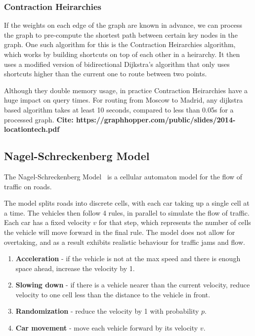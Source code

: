 \documentclass[ %
                    author={Alexander Hill},
                supervisor={Dr. Benjamin Sach},
                    degree={MEng},
                     title={MARMOSET: Multi Agent Real-time Multi-core Online
                     Simulation for Efficient Transportation},
                  subtitle={},
                      type={research},
                      year={2016} ]{dissertation}
\begin{document}
\subsubsection{Contraction Heirarchies}

If the weights on each edge of the graph are known in advance, we can process
the graph to pre-compute the shortest path between certain key nodes in the
graph. One such algorithm for this is the Contraction Heirarchies algorithm,
which works by building shortcuts on top of each other in a heirarchy. It then
uses a modified version of bidirectional Dijkstra's algorithm that only uses
shortcuts higher than the current one to route between two points.

Although they double memory usage, in practice Contraction Heirarchies have a
huge impact on query times. For routing from Moscow to Madrid, any dijkstra based algorithm
takes at least 10 seconds, compared to less than 0.05s for a processed graph.
\textbf{Cite: https://graphhopper.com/public/slides/2014-locationtech.pdf}

\subsection{Nagel-Schreckenberg Model} \label{sec:nagel}

The Nagel-Schreckenberg Model~\cite{nagel} is a cellular automaton model for the flow of
traffic on roads.

The model splits roads into discrete cells, with each car taking up a single
cell at a time. The vehicles then follow 4 rules, in parallel to simulate the
flow of traffic. Each car has a fixed velocity $v$ for that step, which
represents the number of cells the vehicle will move forward in the final rule.
The model does not allow for overtaking, and as a result exhibits realistic
behaviour for traffic jams and flow.

\begin{enumerate}
    \item \textbf{Acceleration} - if the vehicle is not at the max speed and
        there is enough space ahead, increase the velocity by 1.
    \item \textbf{Slowing down} - if there is a vehicle nearer than the current
        velocity, reduce velocity to one cell less than the distance to the
        vehicle in front.
    \item \textbf{Randomization} - reduce the velocity by 1 with probability
        $p$.
    \item \textbf{Car movement} - move each vehicle forward by its velocity $v$.
\end{enumerate}
\end{document}
